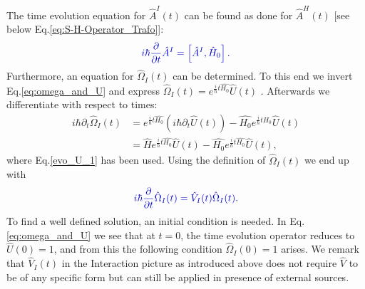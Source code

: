 \documentclass[
11pt, %
english, %
singlespacing, %
headsepline, %
]{MastersDoctoralThesis} %
\begin{document}
The time evolution equation for $ 	\hat{A}^{I}(t) $ can be found as done for $ \hat{A}^{H}(t) $ $ [ $see below Eq.\enskip\eqref{eq:S-H-Operator_Trafo}]:
\begin{equation}\label{eq:time_evo_equ_Intera}
\textcolor[RGB]{0,0,204}{
	i\hbar
	\frac{\partial}{\partial t}
	\hat{A}^{I}
	=
	\left[ 
	\hat{A}^{I},
	\hat{H}_{0}
	\right] .
}
\end{equation}
Furthermore, an equation for $ \hat{\Omega}_{I}(t) $ can be determined. To this end we invert Eq.\enskip\eqref{eq:omega_and_U} and express $  \hat{\Omega}_{I}(t) 
  		= e^{\frac{i}{\hbar}t \hat{H_{0}}}
			\hat{U}(t)  $ . Afterwards we differentiate with respect to times: 
\begin{subequations}
\begin{align}
  		i\hbar\partial_{t}\hat{\Omega}_{I}(t) 
  		 &= 
  		 e^{\frac{i}{\hbar}t\hat{H_{0}}}
  		 \left(i\hbar\partial_{t}\hat{U}(t) \right)
  		 -
  		 \hat{H_{0}}
   		 e^{\frac{i}{\hbar}t\hat{H_{0}}}
 		 \hat{U}(t)
  		 \\
  		 &=
  		 \hat{H}
  		  e^{\frac{i}{\hbar}t\hat{H_{0}}}  		 
  		 \hat{U}(t)  		 
  		 -
  		 \hat{H_{0}}
  		   e^{\frac{i}{\hbar}t\hat{H_{0}}}
  		 \hat{U}(t),
\end{align}
\end{subequations}
where Eq.\enskip\eqref{evo_U_1} has been used. Using the definition of $ \hat{\Omega}_{I}(t) $ we end up with
\begin{equation}\label{eq:time_evo_Omega_interaction}
\textcolor[RGB]{0,0,204}{
	i\hbar
	\frac{\partial}{\partial t}
	\hat{\Omega}_{I}(t)
	=
	\hat{V}_{I}(t)
	\hat{\Omega}_{I}(t)
.}
\end{equation}
To find a well defined solution, an initial condition is needed. In Eq.\enskip\eqref{eq:omega_and_U} we see that at $ t=0 $, the time evolution operator reduces to $ \hat{U}(0)=1 $, and from this the following condition $ \hat{\Omega}_{I}(0) = 1 $ arises.
We remark that $ \hat{V}_{I}(t) $ in the Interaction picture as introduced above does not require $ \hat{V} $ to be of any specific form but can still be applied in presence of external sources. 
\end{document}
